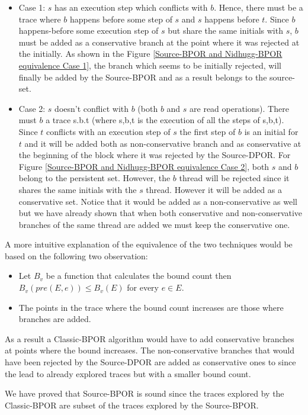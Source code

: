 \begin{itemize}

\item Case 1: $s$ has an execution step which conflicts with $b$. Hence, there must be a trace where $b$ happens before
some step of $s$ and $s$ happens before $t$. Since $b$ happens-before some execution step of $s$ but share the same
initials with $s$, $b$ must be added as a conservative branch at the point where it was rejected at the initially. As
shown in the Figure \ref{Source-BPOR and Nidhugg-BPOR equivalence Case 1}, the branch which seems to be initially
rejected, will finally be added by the Source-BPOR and as a result belongs to the source-set. 
   
\item Case 2: $s$ doesn’t conflict with $b$ (both $b$ and $s$ are read operations). There must $b$ a trace s.b.t (where
   s,b,t is the execution of all the steps of s,b,t). Since $t$ conflicts with an execution step of $s$ the first step
   of $b$ is an initial for $t$ and it will be added both as non-conservative branch and as conservative at the
   beginning of the block where it was rejected by the Source-DPOR. For Figure \ref{Source-BPOR and Nidhugg-BPOR
   equivalence Case 2}, both $s$ and $b$ belong to the persistent set. However, the $b$ thread will be rejected since it
   shares the same initials with the $s$ thread. However it will be added as a conservative set. Notice that it would be
   added as a non-conservative as well but we have already shown that when both conservative and non-conservative
   branches of the same thread are added we must keep the conservative one.


\end{itemize}
   
A more intuitive explanation of the equivalence of the two techniques would be based on the following two observation:
\begin{itemize}
  \item Let $B_v$ be a function that calculates the bound count then $B_v(pre(E,e)) \leq B_v(E)$ for every $e \in E$.
  \item The points in the trace where the bound count increases are those where branches are added.
\end{itemize}

As a result a Classic-BPOR algorithm would have to add conservative branches at points where the bound increases. The
non-conservative branches that would have been rejected by the Source-DPOR are added as conservative ones to since the
lead to already explored traces but with a smaller bound count.

We have proved that Source-BPOR is sound since the traces explored by the Classic-BPOR are subset of the traces explored
by the Source-BPOR.
